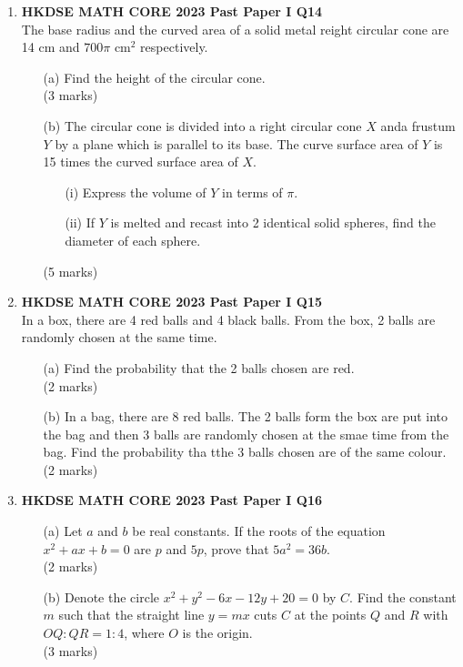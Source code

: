 \documentclass[12pt]{article}
\begin{document}
\begin{enumerate}
	\item \textbf{HKDSE MATH CORE 2023 Past Paper I Q14}\\
	The base radius and the curved area of a solid metal reight circular cone are 14 cm and $700\pi$ cm$^2$ respectively.
	\begin{enumerate}
		\item[(a)] Find the height of the circular cone. \\(3 marks)
		\item[(b)] The circular cone is divided into a right circular cone $X$ anda frustum $Y$ by a plane which is parallel to its base. The curve surface area of $Y$ is 15 times the curved surface area of $X$.
		\begin{enumerate}
			\item[(i)] Express the volume of $Y$ in terms of $\pi$.
			\item[(ii)] If $Y$ is melted and recast into 2 identical solid spheres, find the diameter of each sphere.
		\end{enumerate}
		(5 marks)
	\end{enumerate}

	\item \textbf{HKDSE MATH CORE 2023 Past Paper I Q15}\\
	In a box, there are 4 red balls and 4 black balls. From the box, 2 balls are randomly chosen at the same time.
	\begin{enumerate}
		\item[(a)] Find the probability that the 2 balls chosen are red. \\(2 marks)
		\item[(b)] In a bag, there are 8 red balls. The 2 balls form the box are put into the bag and then 3 balls are randomly chosen at the smae time from the bag. Find the probability tha tthe 3 balls chosen are of the same colour. \\(2 marks)
	\end{enumerate}

	\item \textbf{HKDSE MATH CORE 2023 Past Paper I Q16}
	\begin{enumerate}
		\item[(a)] Let $a$ and $b$ be real constants. If the roots of the equation $x^2 + ax + b = 0$ are $p$ and $5p$, prove that $5a^2 = 36b$. \\(2 marks)
		\item[(b)] Denote the circle $x^2 + y^2 - 6x - 12y + 20 = 0$ by $C$. Find the constant $m$ such that the straight line $y = mx$ cuts $C$ at the points $Q$ and $R$ with $OQ:QR = 1:4$, where $O$ is the origin. \\(3 marks)
	\end{enumerate}


\end{enumerate}
\end{document}
